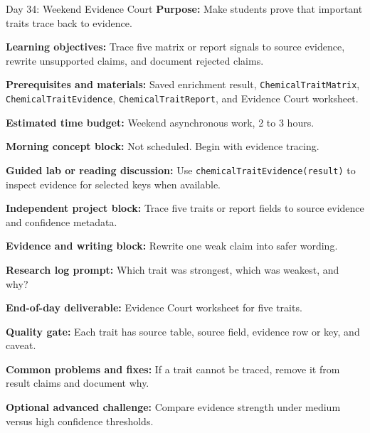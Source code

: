 \begin{dailybox}{Day 34: Weekend Evidence Court}
\textbf{Purpose:} Make students prove that important traits trace back to evidence.

\textbf{Learning objectives:} Trace five matrix or report signals to source evidence, rewrite unsupported claims, and document rejected claims.

\textbf{Prerequisites and materials:} Saved enrichment result, \texttt{ChemicalTraitMatrix}, \texttt{ChemicalTraitEvidence}, \texttt{ChemicalTraitReport}, and Evidence Court worksheet.

\textbf{Estimated time budget:} Weekend asynchronous work, 2 to 3 hours.

\textbf{Morning concept block:} Not scheduled. Begin with evidence tracing.

\textbf{Guided lab or reading discussion:} Use \texttt{chemicalTraitEvidence(result)} to inspect evidence for selected keys when available.

\textbf{Independent project block:} Trace five traits or report fields to source evidence and confidence metadata.

\textbf{Evidence and writing block:} Rewrite one weak claim into safer wording.

\textbf{Research log prompt:} Which trait was strongest, which was weakest, and why?

\textbf{End-of-day deliverable:} Evidence Court worksheet for five traits.

\textbf{Quality gate:} Each trait has source table, source field, evidence row or key, and caveat.

\textbf{Common problems and fixes:} If a trait cannot be traced, remove it from result claims and document why.

\textbf{Optional advanced challenge:} Compare evidence strength under medium versus high confidence thresholds.
\end{dailybox}

